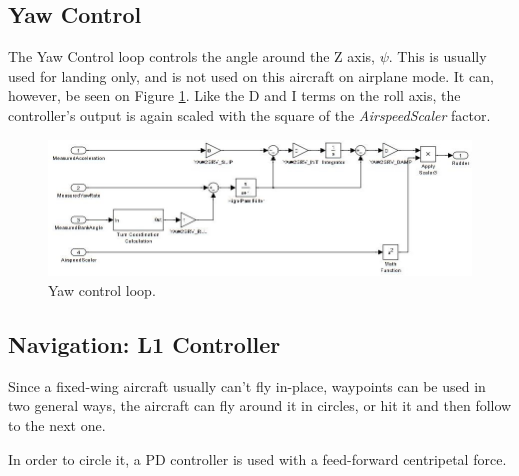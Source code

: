 \subsection{Yaw Control}
The Yaw Control loop controls the angle around the Z axis, $\psi$. This is usually used for landing only, and is not used on this aircraft on airplane mode. It can, however, be seen on Figure \ref{fig:yaw_loop}.
Like the D and I terms on the roll axis, the controller's output is again scaled with the square of the \textit{AirspeedScaler} factor.

\begin{figure}[H]
\centering
  \includegraphics[width=\linewidth]{figs/yaw_control_loop.jpg}
  \caption{Yaw control loop.}
  \label{fig:yaw_loop}
\end{figure}

\subsection{Navigation: L1 Controller}

%
%
Since a fixed-wing aircraft usually can't fly in-place, waypoints can be used in two general ways, the aircraft can fly around it in circles, or hit it and then follow to the next one.

In order to circle it, a PD controller is used with a feed-forward centripetal force.



